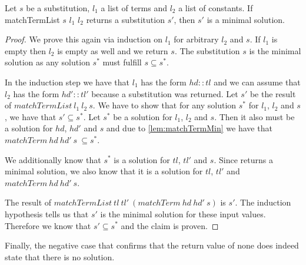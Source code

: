 \begin{lemma}[\matchTermListFindsMinimalSolution]
    Let $s$ be a substitution, $l_1$ a list of terms and $l_2$ a list of constants. If matchTermList $s$ $l_1$ $l_2$ returns a substitution $s'$, then $s'$ is a minimal solution.
\end{lemma}
\begin{proof}
    We prove this again via induction on $l_1$ for arbitrary $l_2$ and $s$. If $l_1$ is empty then $l_2$ is empty as well and we return $s$. The substitution $s$ is the minimal solution as any solution $s^\ast$ must fulfill $s \subseteq s^\ast$.

    In the induction step we have that $l_1$ has the form $hd::tl$ and we can assume that $l_2$ has the form $hd'::tl'$ because a substitution was returned. Let $s'$ be the result of $matchTermList\ l_1\ l_2\ s$. We have to show that for any solution $s^\ast$ for $l_1$, $l_2$ and $s$, we have that $s' \subseteq s^\ast$.
    Let $s^\ast$ be a solution for $l_1$, $l_2$ and $s$. Then it also must be a solution for $hd$, $hd'$ and $s$ and due to \cref{lem:matchTermMin} we have that $matchTerm\ hd\ hd'\ s\ \subseteq s^\ast$. 

    We additionally know that $s^\ast$ is a solution for $tl$, $tl'$ and $s$. Since \matchTerm returns a minimal solution, we also know that it is a solution for $tl$, $tl'$ and $matchTerm\ hd\ hd'\ s$. 

    The result of $matchTermList\ tl\ tl'\ (matchTerm\ hd\ hd'\ s)$ is $s'$. The induction hypothesis tells us that $s'$ is the minimal solution for these input values. Therefore we know that $s' \subseteq s^\ast$ and the claim is proven. 
    
\end{proof}

Finally, the negative case that confirms that the return value of none does indeed state that there is no solution.


